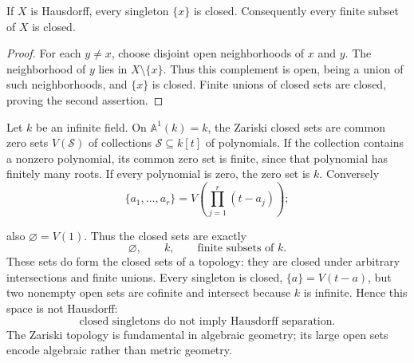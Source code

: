 \begin{proposition}\label{prop:hausdorff-singletons}
If $X$ is Hausdorff, every singleton $\{x\}$ is closed. Consequently
every finite subset of $X$ is closed.
\end{proposition}
\begin{proof}
For each $y\ne x$, choose disjoint open neighborhoods of $x$ and $y$.
The neighborhood of $y$ lies in $X\setminus\{x\}$. Thus this complement
is open, being a union of such neighborhoods, and $\{x\}$ is closed.
Finite unions of closed sets are closed, proving the second assertion.
\end{proof}
\begin{example}\label{ex:zariski-line}
Let $k$ be an infinite field. On $\mathbb A^1(k)=k$, the Zariski closed
sets are common zero sets $V(\mathcal S)$ of collections
$\mathcal S\subseteq k[t]$ of polynomials. If the collection contains a
nonzero polynomial, its common zero set is finite, since that polynomial
has finitely many roots. If every polynomial is zero, the zero set is $k$.
Conversely
\[
\{a_1,\ldots,a_r\}=V(\prod_{j=1}^r(t-a_j));
\]

also $\varnothing=V(1)$. Thus the closed sets are exactly
\[
\varnothing,\qquad k,\qquad\text{finite subsets of }k.
\]
These sets do form the closed sets of a topology: they are closed under
arbitrary intersections and finite unions. Every singleton is closed,
$\{a\}=V(t-a)$, but two nonempty open sets are cofinite and intersect
because $k$ is infinite. Hence this space is not Hausdorff:
\[
\boxed{\text{closed singletons do not imply Hausdorff separation}.}
\]
The Zariski topology is fundamental in algebraic geometry; its large open
sets encode algebraic rather than metric geometry.
\end{example}

